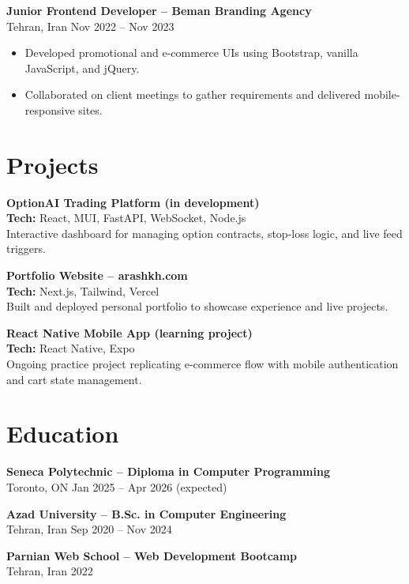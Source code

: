 \documentclass[letterpaper,11pt]{article}
\begin{document}
\textbf{Junior Frontend Developer – Beman Branding Agency}\\
Tehran, Iran \hfill Nov 2022 -- Nov 2023
\begin{itemize}[leftmargin=*]
  \item Developed promotional and e-commerce UIs using Bootstrap, vanilla JavaScript, and jQuery.
  \item Collaborated on client meetings to gather requirements and delivered mobile-responsive sites.
\end{itemize}

\section*{Projects}
\textbf{OptionAI Trading Platform (in development)}\\
\textbf{Tech:} React, MUI, FastAPI, WebSocket, Node.js\\
Interactive dashboard for managing option contracts, stop-loss logic, and live feed triggers.

\textbf{Portfolio Website – arashkh.com}\\
\textbf{Tech:} Next.js, Tailwind, Vercel\\
Built and deployed personal portfolio to showcase experience and live projects.

\textbf{React Native Mobile App (learning project)}\\
\textbf{Tech:} React Native, Expo\\
Ongoing practice project replicating e-commerce flow with mobile authentication and cart state management.

\section*{Education}
\textbf{Seneca Polytechnic – Diploma in Computer Programming}\\
Toronto, ON \hfill Jan 2025 -- Apr 2026 (expected)

\textbf{Azad University – B.Sc. in Computer Engineering}\\
Tehran, Iran \hfill Sep 2020 -- Nov 2024

\textbf{Parnian Web School – Web Development Bootcamp}\\
Tehran, Iran \hfill 2022
\end{document}
